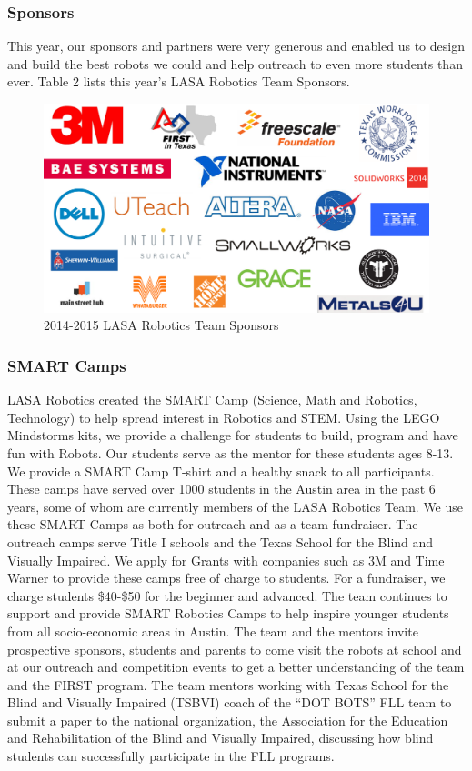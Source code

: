 \subsubsection{Sponsors}
This year, our sponsors and partners were very generous and enabled us to design and build the best robots we could and help outreach to even more students than ever.  Table 2 lists this year’s LASA Robotics Team Sponsors.

\begin{figure}[H]
	\centering
	\includegraphics[width=\linewidth]{sponsors}
	\caption[]{2014-2015 LASA Robotics Team Sponsors}
	\label{fig:sponsors}
\end{figure}

\subsubsection{SMART Camps}
LASA Robotics created the SMART Camp (Science, Math and Robotics, Technology) to help spread interest in Robotics and STEM.  Using the LEGO Mindstorms kits, we provide a challenge for students to build, program and have fun with Robots. Our students serve as the mentor for these students ages 8-13.  We provide a SMART Camp T-shirt and a healthy snack to all participants.  These camps have served over 1000 students in the Austin area in the past 6 years, some of whom are currently members of the LASA Robotics Team.  We use these SMART Camps as both for outreach and as a team fundraiser. The outreach camps serve Title I schools and the Texas School for the Blind and Visually Impaired.  We apply for Grants with companies such as 3M and Time Warner to provide these camps free of charge to students.  For a fundraiser, we charge students \$40-\$50 for the beginner and advanced.  The team continues to support and provide SMART Robotics Camps to help inspire younger students from all socio-economic areas in Austin. The team and the mentors invite prospective sponsors, students and parents to come visit the robots at school and at our outreach and competition events to get a better understanding of the team and the FIRST program. The team mentors working with Texas School for the Blind and Visually Impaired (TSBVI) coach of the “DOT BOTS” FLL team to submit a paper to the national organization, the Association for the Education and Rehabilitation of the Blind and Visually Impaired, discussing how blind students can successfully participate in the FLL programs.

